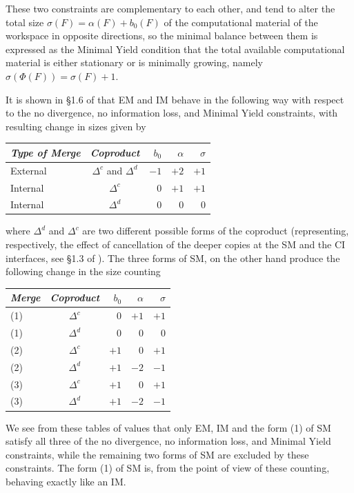 \documentclass[12pt]{amsart}
\numberwithin{equation}{section}
\begin{document}
These two constraints are complementary to each other, and
tend to alter the total size $\sigma(F)=\alpha(F)+b_0(F)$ of the
computational material of the workspace in opposite directions,
so the minimal balance between them is expressed as the 
Minimal Yield condition that the total available
computational material is either stationary or
is minimally growing, namely $\sigma(\Phi(F))=\sigma(F)+1$.

It is shown in \S 1.6 of \cite{MCB} that EM and IM 
behave in the following way with
respect to the no divergence, no information loss, and
Minimal Yield constraints, with resulting change in sizes given by
\begin{center}
\begin{tabular}{| l | c ||r|r|r|}
\hline
{\em Type of Merge} &{\em Coproduct} & $b_0$ & $\alpha$ & $\sigma$  \\
\hline
External & $\Delta^c$ and $\Delta^d$ & $-1$ & $+2$ & $+1$  \\
\hline
Internal & $\Delta^c$ & $0$ & $+1$ & $+1$  \\
\hline
Internal & $\Delta^d$  & $0$ & $0$ & $0$  \\
\hline
\end{tabular}
\end{center}
where $\Delta^d$ and $\Delta^c$ are two different possible
forms of the coproduct (representing, respectively, the effect
of cancellation of the deeper copies at the SM and the CI
interfaces, see \S 1.3 of \cite{MCB}). The three forms of
SM, on the other hand produce the following change in the
size counting
\begin{center}
\begin{tabular}{| l  | c ||r|r|r|}
\hline
{\em Merge}  & {\em Coproduct} & $b_0$ & $\alpha$ & $\sigma$  \\
\hline
(1) &  $\Delta^c$ & $0$  &  $+1$  &   $+1$      \\
\hline
(1) & $\Delta^d$ &  $0$ & $0$  & $0$  \\
\hline
(2)  & $\Delta^c$ & $+1$  & $0$  &  $+1$     \\
\hline
(2)  &  $\Delta^d$ &  $+1$ & $-2$  & $-1$    \\
\hline
(3)  & $\Delta^c$ & $+1$   & $0$  & $+1$    \\
\hline
(3)  & $\Delta^d$ & $+1$  & $-2$  & $-1$     \\
\hline
\end{tabular}
\end{center}
We see from these tables of values that only EM, IM and
the form (1) of SM satisfy all three of the no divergence, 
no information loss, and Minimal Yield constraints, while
the remaining two forms of SM are excluded by these
constraints. The form (1) of SM is, from the point of view
of these counting, behaving exactly like an IM. 
\end{document}
